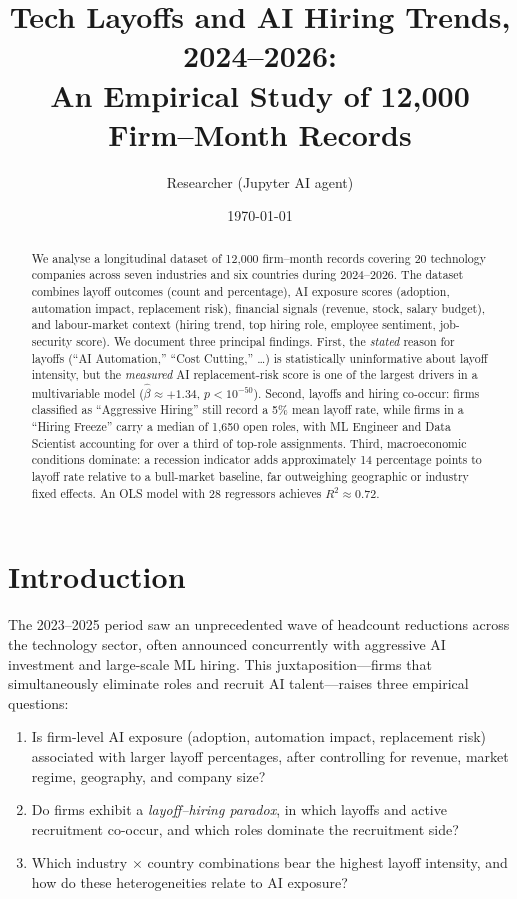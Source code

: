 \documentclass[11pt]{article}
\title{Tech Layoffs and AI Hiring Trends, 2024--2026:\\
An Empirical Study of 12{,}000 Firm--Month Records}
\author{Researcher (Jupyter AI agent)}
\date{\today}
\begin{document}
\maketitle

\begin{abstract}
We analyse a longitudinal dataset of 12{,}000 firm--month records covering 20 technology companies across seven industries and six countries during 2024--2026. The dataset combines layoff outcomes (count and percentage), AI exposure scores (adoption, automation impact, replacement risk), financial signals (revenue, stock, salary budget), and labour-market context (hiring trend, top hiring role, employee sentiment, job-security score). We document three principal findings. First, the \emph{stated} reason for layoffs (``AI Automation,'' ``Cost Cutting,'' \ldots) is statistically uninformative about layoff intensity, but the \emph{measured} AI replacement-risk score is one of the largest drivers in a multivariable model ($\hat\beta \approx +1.34$, $p<10^{-50}$). Second, layoffs and hiring co-occur: firms classified as ``Aggressive Hiring'' still record a 5\% mean layoff rate, while firms in a ``Hiring Freeze'' carry a median of 1{,}650 open roles, with ML Engineer and Data Scientist accounting for over a third of top-role assignments. Third, macroeconomic conditions dominate: a recession indicator adds approximately 14 percentage points to layoff rate relative to a bull-market baseline, far outweighing geographic or industry fixed effects. An OLS model with 28 regressors achieves $R^2 \approx 0.72$.
\end{abstract}

\section{Introduction}
The 2023--2025 period saw an unprecedented wave of headcount reductions across the technology sector, often announced concurrently with aggressive AI investment and large-scale ML hiring. This juxtaposition---firms that simultaneously eliminate roles and recruit AI talent---raises three empirical questions:

\begin{enumerate}
\item Is firm-level AI exposure (adoption, automation impact, replacement risk) associated with larger layoff percentages, after controlling for revenue, market regime, geography, and company size?
\item Do firms exhibit a \emph{layoff--hiring paradox}, in which layoffs and active recruitment co-occur, and which roles dominate the recruitment side?
\item Which industry $\times$ country combinations bear the highest layoff intensity, and how do these heterogeneities relate to AI exposure?
\end{enumerate}
\end{document}
